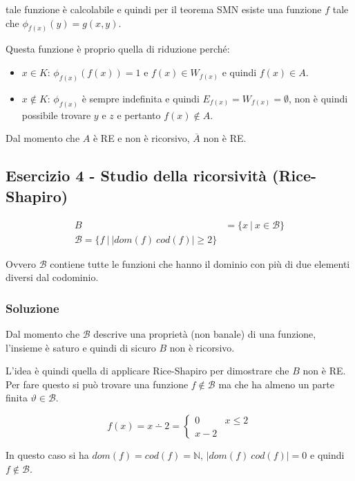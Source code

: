 tale funzione è calcolabile e quindi per il teorema SMN esiste una funzione $f$ tale che $\phi_{f(x)}(y) = g(x,y)$.

Questa funzione è proprio quella di riduzione perché:

\begin{itemize}
	\item $x \in K$: $\phi_{f(x)}(f(x)) = 1$ e $f(x) \in W_{f(x)}$ e quindi $f(x) \in A$.
	\item $x \notin K$: $\phi_{f(x)}$ è sempre indefinita e quindi $E_{f(x)} = W_{f(x)} = \emptyset$, non è quindi possibile trovare $y$ e $z$ e pertanto $f(x) \notin A$.
\end{itemize}

Dal momento che $A$ è RE e non è ricorsivo, $\overline{A}$ non è RE.

\subsection{Esercizio 4 - Studio della ricorsività (Rice-Shapiro)}

\begin{align*}
	B &= \{ x \:| \: x \in \mathcal{B} \} \\
	\mathcal{B} = \{ f \: |\: |dom(f) \ cod(f) | \geq 2 \}
\end{align*}

Ovvero $\mathcal{B}$ contiene tutte le funzioni che hanno il dominio con più di due elementi diversi dal codominio.

\subsubsection{Soluzione}

Dal momento che $\mathcal{B}$ descrive una proprietà (non banale) di una funzione, l'insieme è saturo e quindi di sicuro $B$ non è ricorsivo.

L'idea è quindi quella di applicare Rice-Shapiro per dimostrare che $B$ non è RE. Per fare questo si può trovare una funzione $f \notin \mathcal{B}$ ma che ha almeno un parte finita $\vartheta \in \mathcal{B}$.

$$
f(x) = x \dotminus 2 = \begin{cases}
0 &x \leq 2 \\
x -2 
\end{cases}
$$

In questo caso si ha $dom(f) = cod(f) = \mathbb{N}$, $| dom(f) \ cod(f)| = 0$ e quindi $f \notin \mathcal{B}$.

